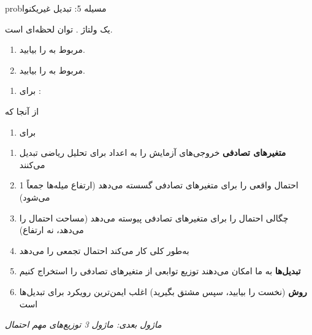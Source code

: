 \begin{PSbox}[unbreakable]{prob}{مسیله 5: تبدیل غیریکنوا}

یک ولتاژ . توان لحظه‌ای  است.

\begin{enumerate}
\def\labelenumi{(\PSalph{enumi})}
\tightlist
\item
   مربوط به  را بیابید.
\item
   مربوط به  را بیابید.
\end{enumerate}

\PSsolution{} 

\begin{enumerate}
\def\labelenumi{(\PSalph{enumi})}
\tightlist
\item
  برای :\PSbr{}
\end{enumerate}

از آنجا که 


\begin{enumerate}
\def\labelenumi{(\PSalph{enumi})}
\setcounter{enumi}{1}
\item
   برای 
\end{enumerate}

\end{PSbox}


\begin{enumerate}
\def\labelenumi{\arabic{enumi}.}
\tightlist
\item
  \textbf{متغیرهای تصادفی} خروجی‌های آزمایش را به اعداد برای تحلیل ریاضی تبدیل می‌کنند
\item
   احتمال واقعی را برای متغیرهای تصادفی گسسته می‌دهد (ارتفاع میله‌ها جمعاً 1 می‌شود)
\item
   چگالی احتمال را برای متغیرهای تصادفی پیوسته می‌دهد (مساحت احتمال را می‌دهد، نه ارتفاع)
\item
   به‌طور کلی کار می‌کند  احتمال تجمعی  را می‌دهد
\item
  \textbf{تبدیل‌ها} به ما امکان می‌دهند توزیع توابعی از متغیرهای تصادفی را استخراج کنیم
\item
  \textbf{روش } (نخست  را بیابید، سپس مشتق بگیرید) اغلب ایمن‌ترین رویکرد برای تبدیل‌ها است
\end{enumerate}

\emph{ماژول بعدی: {ماژول 3  توزیع‌های مهم احتمال}}
